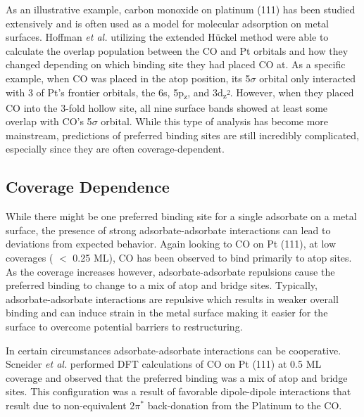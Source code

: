 As an illustrative example, carbon monoxide on platinum (111) has been studied
extensively\citep{Ertl:1977cg, Kelemen:1979ad, Yeo:1997th, Wong:1991ta, Feibelman:2001qa, Deshlahra:2009wu,
Deshlahra:2012aa} and is often used as a model for molecular adsorption on
metal surfaces.  Hoffman {\em et al.} utilizing the extended H\"uckel
method\citep{Wong:1991ta} were able to calculate the overlap population between
the CO and Pt orbitals and how they changed depending on which binding site
they had placed CO at. As a specific example, when CO was placed in the atop
position, its 5$\sigma$ orbital only interacted with 3 of Pt's frontier
orbitals, the 6s, 5p\textsubscript{z}, and
3d\textsubscript{z\textsuperscript{2}}. However, when they placed CO into the
3-fold hollow site, all nine surface bands showed at least some overlap with
CO's 5$\sigma$ orbital. While this type of analysis has become more mainstream,
predictions of preferred binding sites are still incredibly complicated,
especially since they are often coverage-dependent.

\subsection{Coverage Dependence}
While there might be one preferred binding site for a single adsorbate on a
metal surface, the presence of strong adsorbate-adsorbate interactions can lead
to deviations from expected behavior. Again looking to CO on Pt (111), at low
coverages ( $<$ 0.25 ML), CO has been observed to bind primarily to atop sites.
As the coverage increases however, adsorbate-adsorbate repulsions cause the
preferred binding to change to a mix of atop and bridge sites.\citep{Deshlahra:2012aa} Typically,
adsorbate-adsorbate interactions are repulsive which results in weaker overall
binding and can induce strain in the metal surface making it easier for the
surface to overcome potential barriers to restructuring.

In certain circumstances adsorbate-adsorbate interactions can be cooperative.
Scneider {\em et al.} performed DFT calculations of CO on Pt (111) at 0.5 ML
coverage and observed that the preferred binding was a mix of atop and bridge
sites.\citep{Deshlahra:2012aa} This configuration was a result of favorable
dipole-dipole interactions that result due to non-equivalent $2\pi^*$
back-donation from the Platinum to the CO.


